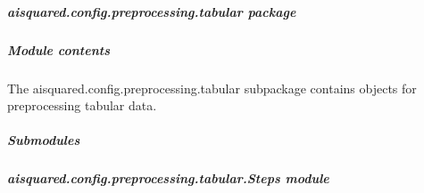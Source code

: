 \documentclass[letterpaper,10pt,english]{sphinxmanual}
\begin{document}
\sphinxstepscope


\subparagraph{aisquared.config.preprocessing.tabular package}
\label{\detokenize{aisquared.config.preprocessing.tabular:aisquared-config-preprocessing-tabular-package}}\label{\detokenize{aisquared.config.preprocessing.tabular::doc}}

\subparagraph{Module contents}
\label{\detokenize{aisquared.config.preprocessing.tabular:module-aisquared.config.preprocessing.tabular}}\label{\detokenize{aisquared.config.preprocessing.tabular:module-contents}}
\sphinxAtStartPar
The aisquared.config.preprocessing.tabular subpackage contains objects for preprocessing tabular data.


\subparagraph{Submodules}
\label{\detokenize{aisquared.config.preprocessing.tabular:submodules}}

\subparagraph{aisquared.config.preprocessing.tabular.Steps module}
\label{\detokenize{aisquared.config.preprocessing.tabular:module-aisquared.config.preprocessing.tabular.Steps}}\label{\detokenize{aisquared.config.preprocessing.tabular:aisquared-config-preprocessing-tabular-steps-module}}
\end{document}
